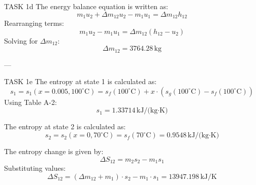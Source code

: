 TASK 1d  
The energy balance equation is written as:  
\[
m_1 u_2 + \Delta m_{12} u_2 - m_1 u_1 = \Delta m_{12} h_{12}
\]  
Rearranging terms:  
\[
m_1 u_2 - m_1 u_1 = \Delta m_{12} (h_{12} - u_2)
\]  
Solving for \( \Delta m_{12} \):  
\[
\Delta m_{12} = 3764.28 \, \text{kg}
\]  

---

TASK 1e  
The entropy at state 1 is calculated as:  
\[
s_1 = s_1(x = 0.005, 100^\circ\text{C}) = s_f(100^\circ\text{C}) + x \cdot (s_g(100^\circ\text{C}) - s_f(100^\circ\text{C}))
\]  
Using Table A-2:  
\[
s_1 = 1.33714 \, \text{kJ/(kg·K)}
\]  

The entropy at state 2 is calculated as:  
\[
s_2 = s_2(x = 0, 70^\circ\text{C}) = s_f(70^\circ\text{C}) = 0.9548 \, \text{kJ/(kg·K)}
\]  

The entropy change is given by:  
\[
\Delta S_{12} = m_2 s_2 - m_1 s_1
\]  
Substituting values:  
\[
\Delta S_{12} = (\Delta m_{12} + m_1) \cdot s_2 - m_1 \cdot s_1 = 13947.198 \, \text{kJ/K}
\]